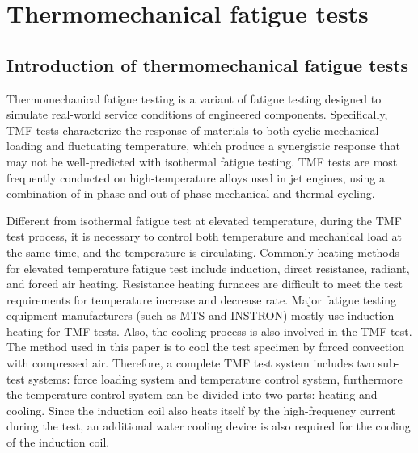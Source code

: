 \section{Thermomechanical fatigue tests}
\subsection{Introduction of thermomechanical fatigue tests}
\noindent
Thermomechanical fatigue testing is a variant of fatigue testing designed to simulate real-world service conditions of engineered components.
Specifically, TMF tests characterize the response of materials to both cyclic mechanical loading and fluctuating temperature, which produce a synergistic response that may not be well-predicted with isothermal fatigue testing.
TMF tests are most frequently conducted on high-temperature alloys used in jet engines, using a combination of in-phase and out-of-phase mechanical and thermal cycling.

Different from isothermal fatigue test at elevated temperature, during the TMF test process, it is necessary to control both temperature and mechanical load at the same time, and the temperature is circulating.
Commonly heating methods for elevated temperature fatigue test include induction, direct resistance, radiant, and forced air heating.
Resistance heating furnaces are difficult to meet the test requirements for temperature increase and decrease rate. Major fatigue testing equipment manufacturers (such as MTS and INSTRON) mostly use induction heating for TMF tests.
Also, the cooling process is also involved in the TMF test. The method used in this paper is to cool the test specimen by forced convection with compressed air.
Therefore, a complete TMF test system includes two sub-test systems: force loading system and temperature control system, furthermore the temperature control system can be divided into two parts: heating and cooling.
Since the induction coil also heats itself by the high-frequency current during the test, an additional water cooling device is also required for the cooling of the induction coil.

